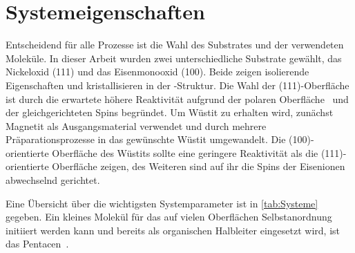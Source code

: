     \section{Systemeigenschaften} \label{sec:Systeme}
        Entscheidend für alle Prozesse ist die Wahl des Substrates und der verwendeten Moleküle.
        In dieser Arbeit wurden zwei unterschiedliche Substrate gewählt, das Nickeloxid (111) und das Eisenmonooxid (100).
        Beide zeigen isolierende Eigenschaften und kristallisieren in der -Struktur.
        Die Wahl der (111)-Oberfläche ist durch die erwartete höhere Reaktivität aufgrund der polaren Oberfläche~\cite{cappus_hydroxyl_1993} und der gleichgerichteten Spins begründet.
        Um Wüstit zu erhalten wird, zunächst Magnetit als Ausgangsmaterial verwendet und durch mehrere Präparationsprozesse in das gewünschte Wüstit umgewandelt.
        Die (100)-orientierte Oberfläche des Wüstits sollte eine geringere Reaktivität als die (111)-orientierte Oberfläche zeigen, des Weiteren sind auf ihr die Spins der Eisenionen abwechselnd gerichtet. %
        
        Eine Übersicht über die wichtigsten Systemparameter ist in \autoref{tab:Systeme} gegeben.
        Ein kleines Molekül für das auf vielen Oberflächen Selbstanordnung initiiert werden kann und bereits als organischen Halbleiter eingesetzt wird, ist das Pentacen~\cite{5A_9, 5A_13}.

